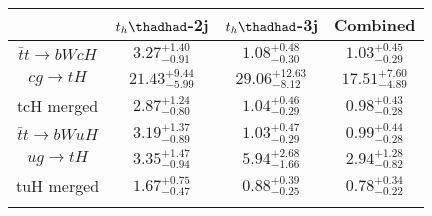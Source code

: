 
\centering
\begin{tabular}{cccc} \toprule\toprule
 & $t_h\thadhad$-2j & $t_h\thadhad$-3j & Combined\\\midrule
$\bar{t}t\to bWcH$ & $3.27^{+1.40}_{-0.91}$ & $1.08^{+0.48}_{-0.30}$ & $1.03^{+0.45}_{-0.29}$\\
$cg\to tH$ & $21.43^{+9.44}_{-5.99}$ & $29.06^{+12.63}_{-8.12}$ & $17.51^{+7.60}_{-4.89}$\\
tcH merged & $2.87^{+1.24}_{-0.80}$ & $1.04^{+0.46}_{-0.29}$ & $0.98^{+0.43}_{-0.28}$\\
$\bar{t}t\to bWuH$ & $3.19^{+1.37}_{-0.89}$ & $1.03^{+0.47}_{-0.29}$ & $0.99^{+0.44}_{-0.28}$\\
$ug\to tH$ & $3.35^{+1.47}_{-0.94}$ & $5.94^{+2.68}_{-1.66}$ & $2.94^{+1.28}_{-0.82}$\\
tuH merged & $1.67^{+0.75}_{-0.47}$ & $0.88^{+0.39}_{-0.25}$ & $0.78^{+0.34}_{-0.22}$\\
\bottomrule\bottomrule\\
\end{tabular}
